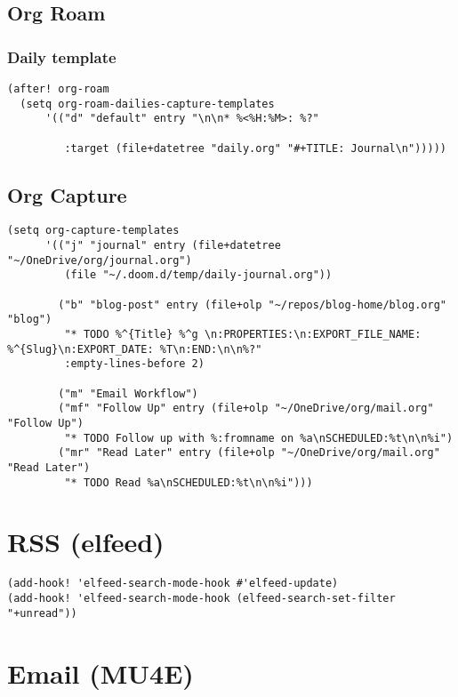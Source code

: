 \documentclass[11pt]{article}
\begin{document}
\subsection{Org Roam}
\label{sec:orge59c827}

\subsubsection{Daily template}
\label{sec:org9801569}

\begin{verbatim}
(after! org-roam
  (setq org-roam-dailies-capture-templates
      '(("d" "default" entry "\n\n* %<%H:%M>: %?"

         :target (file+datetree "daily.org" "#+TITLE: Journal\n")))))
\end{verbatim}
\subsection{Org Capture}
\label{sec:org2c9f8a7}

\begin{verbatim}
(setq org-capture-templates
      '(("j" "journal" entry (file+datetree "~/OneDrive/org/journal.org")
         (file "~/.doom.d/temp/daily-journal.org"))

        ("b" "blog-post" entry (file+olp "~/repos/blog-home/blog.org" "blog")
         "* TODO %^{Title} %^g \n:PROPERTIES:\n:EXPORT_FILE_NAME: %^{Slug}\n:EXPORT_DATE: %T\n:END:\n\n%?"
         :empty-lines-before 2)

        ("m" "Email Workflow")
        ("mf" "Follow Up" entry (file+olp "~/OneDrive/org/mail.org" "Follow Up")
         "* TODO Follow up with %:fromname on %a\nSCHEDULED:%t\n\n%i")
        ("mr" "Read Later" entry (file+olp "~/OneDrive/org/mail.org" "Read Later")
         "* TODO Read %a\nSCHEDULED:%t\n\n%i")))
\end{verbatim}
\section{RSS (elfeed)}
\label{sec:org6d1d334}

\begin{verbatim}
(add-hook! 'elfeed-search-mode-hook #'elfeed-update)
(add-hook! 'elfeed-search-mode-hook (elfeed-search-set-filter "+unread"))
\end{verbatim}
\section{Email (MU4E)}
\label{sec:orgcc2ef0d}
\end{document}
